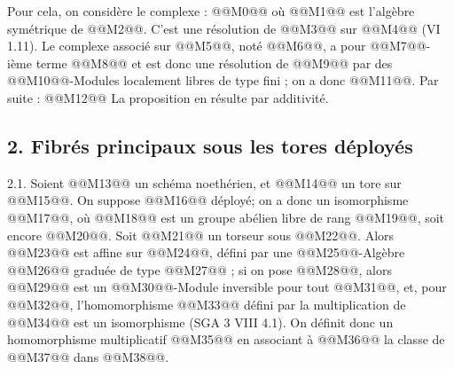 
Pour cela, on considère le complexe :
@@M0@@
où @@M1@@ est l'algèbre symétrique de @@M2@@. C'est une résolution de @@M3@@ sur @@M4@@ (VI 1.11). Le complexe associé sur @@M5@@, noté @@M6@@, a pour @@M7@@-ième terme @@M8@@ et est donc une résolution de @@M9@@ par des @@M10@@-Modules localement libres de type fini ; on a donc @@M11@@. Par suite :
@@M12@@
La proposition en résulte par additivité.

\subsection*{2. Fibrés principaux sous les tores déployés}

2.1. Soient @@M13@@ un schéma noethérien, et @@M14@@ un tore sur @@M15@@. On suppose @@M16@@ déployé; on a donc un isomorphisme @@M17@@, où @@M18@@ est un groupe abélien libre de rang @@M19@@, soit encore @@M20@@. Soit @@M21@@ un torseur sous @@M22@@. Alors @@M23@@ est affine sur @@M24@@, défini par une @@M25@@-Algèbre @@M26@@ graduée de type @@M27@@ ; si on pose @@M28@@, alors @@M29@@ est un @@M30@@-Module inversible pour tout @@M31@@, et, pour @@M32@@, l'homomorphisme @@M33@@ défini par la multiplication de @@M34@@ est un isomorphisme (SGA 3 VIII 4.1). On définit donc un homomorphisme multiplicatif @@M35@@ en associant à @@M36@@ la classe de @@M37@@ dans @@M38@@.


